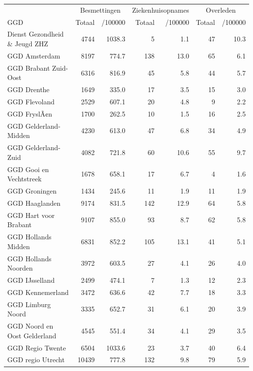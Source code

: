 \documentclass[
  english,
  man,floatsintext]{apa6}
\begin{document}
\begin{table}[H]
\centering\begingroup\fontsize{10}{12}\selectfont

\begin{threeparttable}
\begin{tabular}{lrrrrrr}
\toprule
\multicolumn{1}{c}{ } & \multicolumn{2}{c}{Besmettingen} & \multicolumn{2}{c}{Ziekenhuisopnames} & \multicolumn{2}{c}{Overleden} \\
\cmidrule(l{3pt}r{3pt}){2-3} \cmidrule(l{3pt}r{3pt}){4-5} \cmidrule(l{3pt}r{3pt}){6-7}
GGD & Totaal & /100000 & Totaal & /100000 & Totaal & /100000\\
\midrule
Dienst Gezondheid \& Jeugd ZHZ & 4744 & 1038.3 & 5 & 1.1 & 47 & 10.3\\
GGD Amsterdam & 8197 & 774.7 & 138 & 13.0 & 65 & 6.1\\
GGD Brabant Zuid-Oost & 6316 & 816.9 & 45 & 5.8 & 44 & 5.7\\
GGD Drenthe & 1649 & 335.0 & 17 & 3.5 & 15 & 3.0\\
GGD Flevoland & 2529 & 607.1 & 20 & 4.8 & 9 & 2.2\\
GGD FryslÃ¢n & 1700 & 262.5 & 10 & 1.5 & 16 & 2.5\\
GGD Gelderland-Midden & 4230 & 613.0 & 47 & 6.8 & 34 & 4.9\\
GGD Gelderland-Zuid & 4082 & 721.8 & 60 & 10.6 & 55 & 9.7\\
GGD Gooi en Vechtstreek & 1678 & 658.1 & 17 & 6.7 & 4 & 1.6\\
GGD Groningen & 1434 & 245.6 & 11 & 1.9 & 11 & 1.9\\
GGD Haaglanden & 9174 & 831.5 & 142 & 12.9 & 64 & 5.8\\
GGD Hart voor Brabant & 9107 & 855.0 & 93 & 8.7 & 62 & 5.8\\
GGD Hollands Midden & 6831 & 852.2 & 105 & 13.1 & 41 & 5.1\\
GGD Hollands Noorden & 3972 & 603.5 & 27 & 4.1 & 26 & 4.0\\
GGD IJsselland & 2499 & 474.1 & 7 & 1.3 & 12 & 2.3\\
GGD Kennemerland & 3472 & 636.6 & 42 & 7.7 & 18 & 3.3\\
GGD Limburg Noord & 3335 & 652.7 & 31 & 6.1 & 20 & 3.9\\
GGD Noord en Oost Gelderland & 4545 & 551.4 & 34 & 4.1 & 29 & 3.5\\
GGD Regio Twente & 6504 & 1033.6 & 23 & 3.7 & 40 & 6.4\\
GGD regio Utrecht & 10439 & 777.8 & 132 & 9.8 & 79 & 5.9\\

\end{tabular}
\end{threeparttable}
\end{table}
\end{document}
